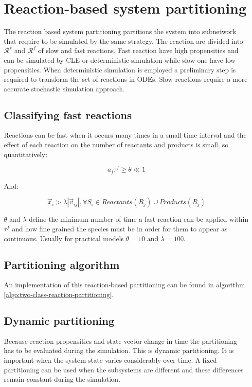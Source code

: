 \section{Reaction-based system partitioning}
The reaction based system partitioning partitions the system into subnetwork that require to be simulated by the same strategy.
The reaction are divided into $\mathcal{R}^s$ and $\mathcal{R}^f$ of slow and fast reactions.
Fast reaction have high propensities and can be simulated by CLE or deterministic simulation while slow one have low propensities.
When deterministic simulation is employed a preliminary step is required to transform the set of reactions in ODEs.
Slow reactions require a more accurate stochastic simulation approach.

  \subsection{Classifying fast reactions}
  Reactions can be fast when it occurs many times in a small time interval and the effect of each reaction on the number of reactants and products is small, so quantitatively:

  $$a_j\tau^f \ge \theta\ll 1$$

  And:

  $$\vec{x}_i > \lambda|\vec{v}_{ij}|, \forall S_i\in Reactants(R_j)\cup Products(R_j)$$

  $\theta$ and $\lambda$ define the minimum number of time a fast reaction can be applied within $\tau^f$ and how fine grained the species must be in order for them to appear as continuous.
Usually for practical models $\theta = 10$ and $\lambda = 100$.

  \subsection{Partitioning algorithm}
  An implementation of this reaction-based partitioning can be found in algorithm \ref{algo:two-class-reaction-partitioning}.

  

  \subsection{Dynamic partitioning}
  Because reaction propensities and state vector change in time the partitioning has to be evaluated during the simulation.
  This is dynamic partitioning.
  It is important when the system state varies considerably over time.
  A fixed partitioning can be used  when the subsystems are different and these differences remain constant during the simulation.

